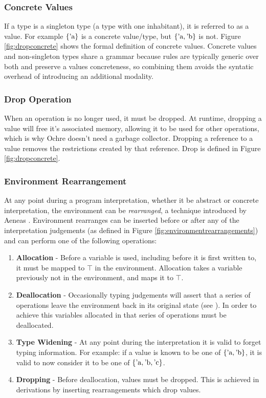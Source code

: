 \documentclass[12pt,twoside]{report}
\begin{document}
\subsubsection{Concrete Values}
If a type is a singleton type (a type with one inhabitant), it is referred to as a value. For example $\{ \text{'a} \}$ is a concrete value/type, but $\{ \text{'a}, \text{'b} \}$ is not. Figure \ref{fig:dropconcrete} shows the formal definition of concrete values. Concrete values and non-singleton types share a grammar because rules are typically generic over both and preserve a values concreteness, so combining them avoids the syntatic overhead of introducing an additional modality.

\subsubsection{Drop Operation}
When an operation is no longer used, it must be dropped. At runtime, dropping a value will free it's associated memory, allowing it to be used for other operations, which is why Ochre doesn't need a garbage collector. Dropping a reference to a value removes the restrictions created by that reference. Drop is defined in Figure \ref{fig:dropconcrete}.

\subsubsection{Environment Rearrangement}
At any point during a program interpretation, whether it be abstract or concrete interpretation, the environment can be \textit{rearranged}, a technique introduced by Aeneas \cite{aeneas}. Environment rearranges can be inserted before or after any of the interpretation judgements (as defined in Figure \ref{fig:environmentrearrangements}) and can perform one of the following operations:

\begin{enumerate}
  \item \textbf{Allocation} - Before a variable is used, including before it is first written to, it must be mapped to $\top$ in the environment. Allocation takes a variable previously not in the environment, and maps it to $\top$.
  \item \textbf{Deallocation} - Occasionally typing judgements will assert that a series of operations leave the environment back in its original state (see ). In order to achieve this variables allocated in that series of operations must be deallocated.
  \item \textbf{Type Widening} - At any point during the interpretation it is valid to forget typing information. For example: if a value is known to be one of $\{ \text{'a}, \text{'b} \}$, it is valid to now consider it to be one of $\{ \text{'a}, \text{'b}, \text{'c} \}$.
  \item \textbf{Dropping} - Before deallocation, values must be dropped. This is achieved in derivations by inserting rearrangements which drop values.
\end{enumerate}
\end{document}
